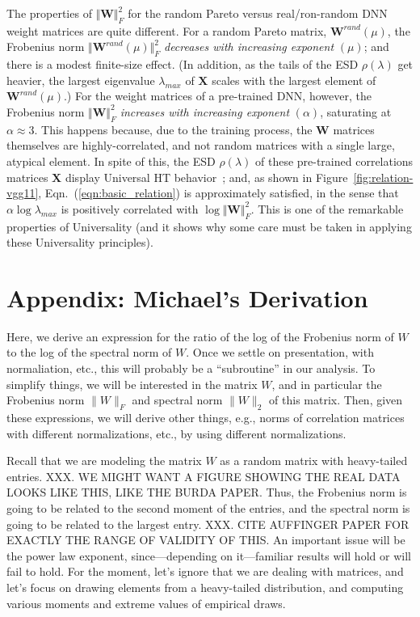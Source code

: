 The properties of $\Vert\mathbf{W}\Vert^{2}_{F}$ for the random Pareto versus real/ron-random DNN weight matrices are quite different.
For a random Pareto matrix, $\mathbf{W}^{rand}(\mu)$, the Frobenius norm $\Vert\mathbf{W}^{rand}(\mu)\Vert^{2}_{F}$ 
\emph{decreases with increasing exponent} $(\mu)$; and there is a modest finite-size effect.
(In addition, as the tails of the ESD $\rho(\lambda)$ get heavier, the largest eigenvalue $\lambda_{max}$ of $\mathbf{X}$ scales with the largest element of $\mathbf{W}^{rand}(\mu)$.) 
For the weight matrices of a pre-trained DNN, however, the Frobenius norm $\Vert\mathbf{W}\Vert^{2}_{F}$ \emph{increases with increasing exponent} $(\alpha)$, saturating at $\alpha\approx 3$.
This happens because, due to the training process, the $\mathbf{W}$ matrices themselves are highly-correlated, and not random matrices with a single large, atypical element.
In spite of this, the ESD $\rho(\lambda)$ of these pre-trained correlations matrices $\mathbf{X}$ display Universal HT behavior~\cite{MM18_TR}; and, as shown in Figure~\ref{fig:relation-vgg11}, 
Eqn.~(\ref{eqn:basic_relation}) is approximately satisfied, in the sense that 
$\alpha\log\lambda_{max}$ is positively correlated with $\log\Vert\mathbf{W}\Vert^{2}_{F} $.
This is one of the remarkable properties of Universality (and it shows why some care must be taken in applying these Universality principles).
 

\newpage
\section{Appendix: Michael's Derivation}
\label{sxn:appendix-michael_derivation}


Here, we derive an expression for the ratio of the log of the Frobenius norm of $W$ to the log of the spectral norm of $W$.
Once we settle on presentation, with normaliation, etc., this will probably be a ``subroutine'' in our analysis.
To simplify things, we will be interested in the matrix $W$, and in particular the Frobenius norm $\|W\|_F$ and spectral norm $\|W\|_2$ of this matrix.
Then, given these expressions, we will derive other things, e.g., norms of correlation matrices with different normalizations, etc., by using different normalizations.  

Recall that we are modeling the matrix $W$ as a random matrix with heavy-tailed entries.
XXX.  WE MIGHT WANT A FIGURE SHOWING THE REAL DATA LOOKS LIKE THIS, LIKE THE BURDA PAPER.
Thus, the Frobenius norm is going to be related to the second moment of the entries, and the spectral norm is going to be related to the largest entry.
XXX.  CITE AUFFINGER PAPER FOR EXACTLY THE RANGE OF VALIDITY OF THIS.
An important issue will be the power law exponent, since---depending on it---familiar results will hold or will fail to hold.
For the moment, let's ignore that we are dealing with matrices, and let's focus on drawing elements from a heavy-tailed distribution, and computing various moments and extreme values of empirical draws.

